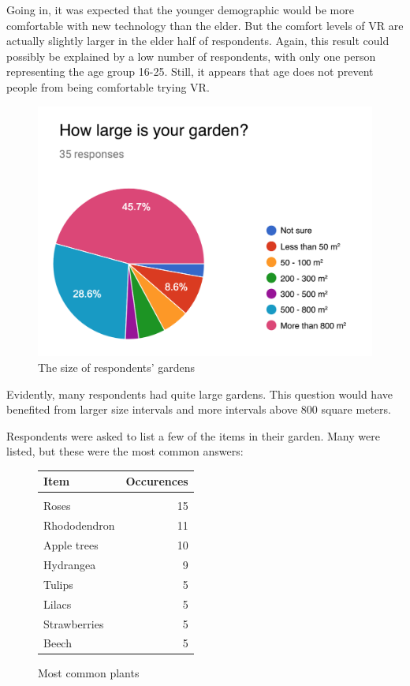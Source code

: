 			Going in, it was expected that the younger demographic would be more comfortable with new technology than the elder. But the comfort levels of VR are actually slightly larger in the elder half of respondents. Again, this result could possibly be explained by a low number of respondents, with only one person representing the age group 16-25. Still, it appears that age does not prevent people from being comfortable trying VR.
			
			\begin{figure}[H]
				\centering
				\includegraphics[width=0.6\linewidth]{figure/Analysis/gardensize.png}
				\caption{The size of respondents' gardens}
				\label{fig:gardensize}
			\end{figure}
			
			Evidently, many respondents had quite large gardens. This question would have benefited from larger size intervals and more intervals above 800 square meters.
			
			Respondents were asked to list a few of the items in their garden. Many were listed, but these were the most common answers:
			\begin{figure}[H]
				\begin{center}
					\begin{tabular}{  l  r }

						Item & Occurences  \\ \hline
						& \\
						Roses & 15 \\ 
						Rhododendron & 11  \\ 
						Apple trees & 10  \\ 
						Hydrangea & 9  \\ 
						Tulips & 5  \\ 
						Lilacs & 5  \\ 
						Strawberries & 5  \\ 
						Beech & 5  \\
					\end{tabular}
				\end{center}
				\caption{Most common plants}
				\label{fig:plantlist}
			\end{figure}
			
